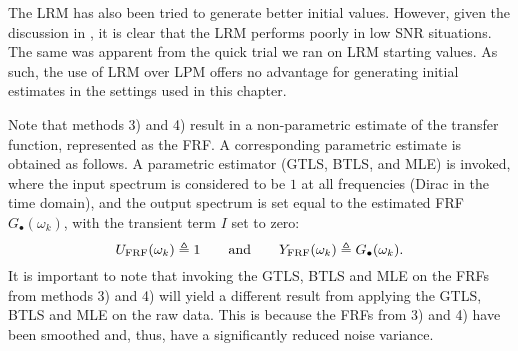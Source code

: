 \begin{remark}
The \gls{LRM} has also been tried to generate better initial values.
However, given the discussion in , it is clear that the \gls{LRM} performs poorly in low \gls{SNR} situations.
The same was apparent from the quick trial we ran on \gls{LRM} starting values.
As such, the use of \gls{LRM} over \gls{LPM} offers no advantage for generating initial estimates in the settings used in this chapter.
\end{remark}

\begin{remark}
Note that methods 3) and 4) result in a non-parametric estimate of the transfer function, represented as the \gls{FRF}. 
A corresponding parametric estimate is obtained as follows. 
A parametric estimator (\gls{GTLS}, \gls{BTLS}, and \gls{MLE}) is invoked, where the input spectrum is considered to be $1$ at all frequencies (Dirac in the time domain), and the output spectrum is set equal to the estimated \gls{FRF} $G_{\bullet}(\omega_k)$, with the transient term $I$ set to zero:
\begin{equation}
  U_{\mathrm{FRF}}(\omega_k) \triangleq 1 
  \qquad \text{and} \qquad
  Y_{\mathrm{FRF}}(\omega_k)  \triangleq G_{\bullet}(\omega_k)
  \text{.}
\end{equation}
It is important to note that invoking the \gls{GTLS}, \gls{BTLS} and \gls{MLE} on the \glspl{FRF} from methods 3) and 4) will yield a different result from applying the \gls{GTLS}, \gls{BTLS} and \gls{MLE} on the raw data. 
This is because the \glspl{FRF} from 3) and 4) have been smoothed and, thus, have a significantly reduced noise variance.
\end{remark}


 
